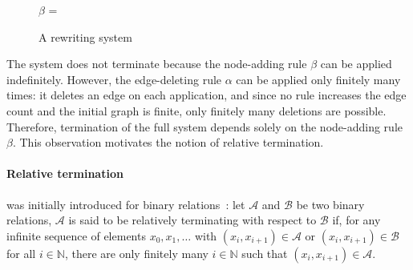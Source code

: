 \begin{figure}[!ht]

        $\beta$ ={
        }
    \caption{A rewriting system}
    \label{fig:intro:edge_deletion_and_node_addition_rule}
  \end{figure}
The system does not terminate because the node-adding rule $\beta$ can be applied indefinitely. However, the edge-deleting rule $\alpha$ can be applied only finitely many times: it deletes an edge on each application, and since no rule increases the edge count and the initial graph is finite, only finitely many deletions are possible. Therefore, termination of the full system depends solely on the node-adding rule $\beta$. This observation motivates the notion of relative termination.

\paragraph{Relative termination} was initially introduced for binary relations~\cite{klop1987term}: let $\mathcal{A}$ and $\mathcal{B}$ be two binary relations, $\mathcal{A}$ is said to be relatively terminating with respect to $\mathcal{B}$ if, for any infinite sequence of elements \( x_0, x_1, \ldots \) with \( (x_i,x_{i+1}) \in \mathcal{A} \) or \( (x_i,x_{i+1}) \in \mathcal{B} \) for all \( i \in \mathbb{N} \), there are only finitely many \( i \in \mathbb{N} \) such that \( (x_i,x_{i+1}) \in \mathcal{A} \).

